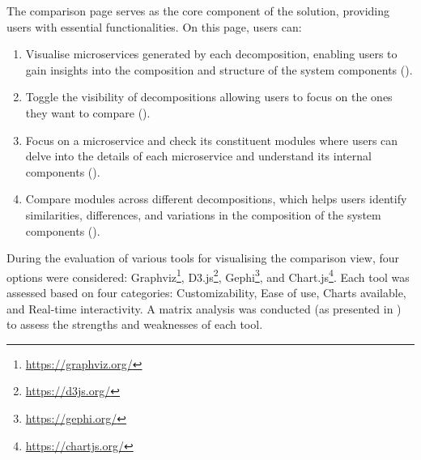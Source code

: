 The comparison page serves as the core component of the solution, providing
users with essential functionalities. On this page, users can:

\begin{enumerate}
  \item Visualise microservices generated by each decomposition, enabling users
    to gain insights into the composition and structure of the system
    components ().
  \item Toggle the visibility of decompositions allowing users to focus on the
    ones they want to compare
    ().
  \item Focus on a microservice and check its constituent modules where users
    can delve into the details of each microservice and understand its internal
    components ().
  \item Compare modules across different decompositions, which helps users
    identify similarities, differences, and variations in the composition of
    the system components ().
\end{enumerate}

During the evaluation of various tools for visualising the comparison view,
four options were considered: Graphviz\footnote{\url{https://graphviz.org/}},
D3.js\footnote{\url{https://d3js.org/}},
Gephi\footnote{\url{https://gephi.org/}}, and
Chart.js\footnote{\url{https://chartjs.org/}}. Each tool was assessed based on
four categories: Customizability, Ease of use, Charts available, and Real-time
interactivity. A matrix analysis was conducted (as presented in
) to assess the strengths and
weaknesses of each tool.

